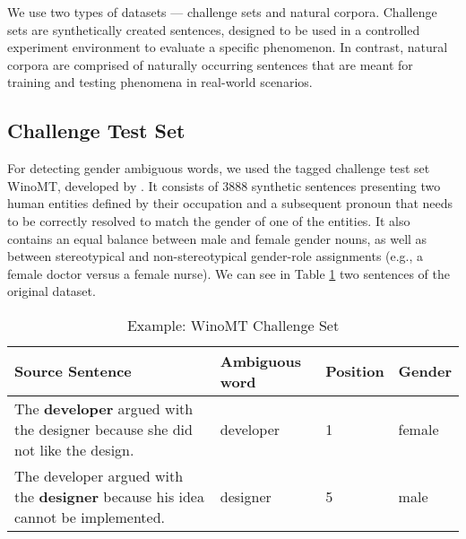 
We use two types of datasets — challenge sets and natural corpora. Challenge sets are synthetically created sentences, designed to be used in a controlled experiment environment to evaluate a specific phenomenon. In contrast, natural corpora are comprised of naturally occurring sentences that are meant for training and testing phenomena in real-world scenarios.

\subsection{Challenge Test Set}
\label{sec:Setup:Challenge_Set}

For detecting gender ambiguous words, we used the tagged challenge test set WinoMT, developed by \citet{Stanovsky_2019}. It consists of 3888 synthetic sentences presenting two human entities defined by their occupation and a subsequent pronoun that needs to be correctly resolved to match the gender of one of the entities. It also contains an equal balance between male and female gender nouns, as well as between stereotypical and non-stereotypical gender-role assignments (e.g., a female doctor versus a female nurse). We can see in Table \ref{tab:winomt} two sentences of the original dataset.


\begin{table}[!htb]
    \begin{tabularx}{\linewidth}{|X|l|l|l|}
        \hline
        \textbf{Source Sentence} & \textbf{Ambiguous word} & \textbf{Position} & \textbf{Gender} \\ \hline
        The \textbf{developer} argued with the designer because she did not like the design. & developer & 1 & female \\ \hline
        The developer argued with the \textbf{designer} because his idea cannot be implemented. & designer & 5 & male \\ \hline
    \end{tabularx}
    \caption{Example: WinoMT Challenge Set}
    \label{tab:winomt}
\end{table}

